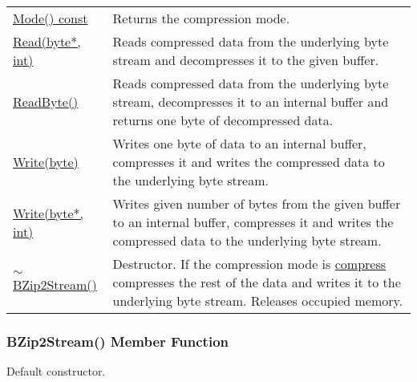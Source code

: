 \documentclass[a4paper,oneside,11.000000pt]{book}
\begin{document}
\begin{flushleft}
\begin{supertabular}[l]{!{\raggedright}p{7.575cm}!{\raggedright}p{7.575cm}}
\\
\hyperlink{System.IO.Compression.BZip2Stream.Mode.C.P.System.IO.Compression.BZip2Stream}{Mode() const}
& Returns the compression mode.

\\
\hyperlink{System.IO.Compression.BZip2Stream.Read.P.System.IO.Compression.BZip2Stream.P.byte.int}{Read(byte*, int)}
& Reads compressed data from the underlying byte stream and decompresses it to the given buffer.

\\
\hyperlink{System.IO.Compression.BZip2Stream.ReadByte.P.System.IO.Compression.BZip2Stream}{ReadByte()}
& Reads compressed data from the underlying byte stream, decompresses it to an internal buffer 
and returns one byte of decompressed data.

\\
\hyperlink{System.IO.Compression.BZip2Stream.Write.P.System.IO.Compression.BZip2Stream.byte}{Write(byte)}
& Writes one byte of data to an internal buffer, compresses it and writes the compressed data
to the underlying byte stream.

\\
\hyperlink{System.IO.Compression.BZip2Stream.Write.P.System.IO.Compression.BZip2Stream.P.byte.int}{Write(byte*, int)}
& Writes given number of bytes from the given buffer to an internal buffer, 
compresses it and writes the compressed data to the underlying byte stream.

\\
\hyperlink{System.IO.Compression.BZip2Stream.destructor.P.System.IO.Compression.BZip2Stream}{$\sim$BZip2Stream()}
& Destructor. If the compression mode is \hyperlink{System.IO.Compression.CompressionMode.compress}{compress} compresses the rest of the data
and writes it to the underlying byte stream. Releases occupied memory.

\\
\end{supertabular}

\end{flushleft}
\clearpage

\hypertarget{System.IO.Compression.BZip2Stream.constructor.P.System.IO.Compression.BZip2Stream}{\subsubsection*{BZip2Stream() Member Function}}\begin{flushleft}
Default constructor.

\end{flushleft}
\end{document}
